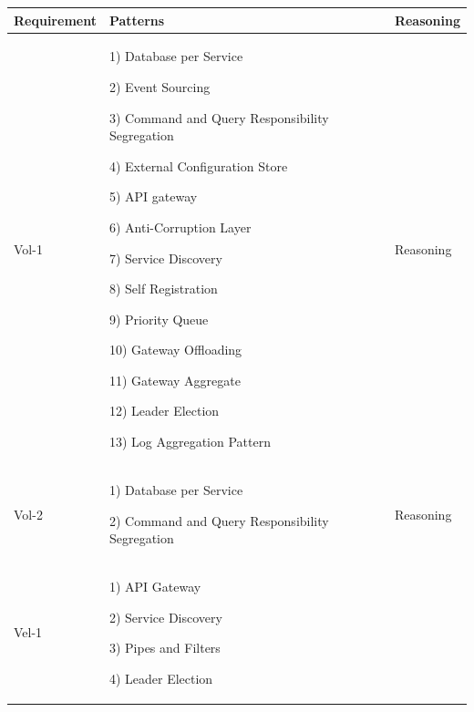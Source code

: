 \documentclass[conference]{IEEEtran}
\begin{document}
\begin{center}
    \begin{table}
    \renewcommand*{\arraystretch}{1.8}
    \begin{tabular}{ | m{2cm} | m{8cm} |  m{2cm} |}

        \hline

        Requirement &  Patterns & Reasoning
 
        \\
        \hline

        Vol-1 &  
        
        1) Database per Service

        2)  Event Sourcing
        
        3)  Command and Query Responsibility Segregation
        
        4)  External Configuration Store
        
        5)  API gateway
        
        6)  Anti-Corruption Layer
        
        7)  Service Discovery
        
        8)  Self Registration
        
        9)  Priority Queue

        10) Gateway Offloading 

        11) Gateway Aggregate 

        12) Leader Election

        13) Log Aggregation Pattern 
        
        & Reasoning 
 
        \\

        \hline

        Vol-2 &  
        
        1) Database per Service  
        
        2) Command and Query Responsibility Segregation
        
        & Reasoning
        
        \\
        \hline

        Vel-1 &  
    
        1) API Gateway 

        2) Service Discovery 

        3) Pipes and Filters 

        4) Leader Election 


\end{tabular}
\end{table}
\end{center}
\end{document}
